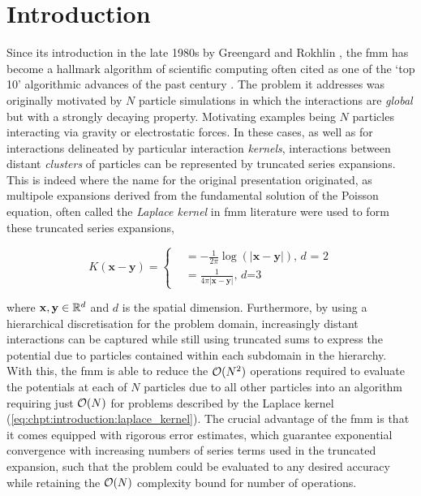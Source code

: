 
\chapter{Introduction}\label{chpt:introduction}
\thispagestyle{chaptertitle} %
Since its introduction in the late 1980s by Greengard and Rokhlin \cite{greengard1987fast}, the \acrfull{fmm} has become a hallmark algorithm of scientific computing often cited as one of the `top 10' algorithmic advances of the past century \cite{cipra2000best}. The problem it addresses was originally motivated by $N$ particle simulations in which the interactions are \textit{global} but with a strongly decaying property. Motivating examples being $N$ particles interacting via gravity or electrostatic forces. In these cases, as well as for interactions delineated by particular interaction \textit{kernels}, interactions between distant \textit{clusters} of particles can be represented by truncated series expansions. This is indeed where the name for the original presentation originated, as multipole expansions derived from the fundamental solution of the Poisson equation, often called the \textit{Laplace kernel} in \acrshort{fmm} literature were used to form these truncated series expansions,


\begin{equation}
    K(\mathbf{x-y}) =  \begin{cases}
        &= -\frac{1}{2\pi} \log(|\mathbf{x-y}|) \text{, $d$ = 2} \\
        &= \frac{1}{4\pi | \mathbf{x-y}|} \text{, $d$=3 }
    \end{cases}
    \label{eq:chpt:introduction:laplace_kernel}
\end{equation}

where $\mathbf{x}, \mathbf{y} \in \mathbb{R}^d$ and $d$ is the spatial dimension. Furthermore, by using a hierarchical discretisation for the problem domain, increasingly distant interactions can be captured while still using truncated sums to express the potential due to particles contained within each subdomain in the hierarchy. With this, the \acrshort{fmm} is able to reduce the $\mathcal{O}(N^2)$ operations required to evaluate the potentials at each of $N$ particles due to all other particles into an algorithm requiring just $\mathcal{O}(N)$ for problems described by the Laplace kernel (\ref{eq:chpt:introduction:laplace_kernel}). The crucial advantage of the \acrshort{fmm} is that it comes equipped with rigorous error estimates, which guarantee exponential convergence with increasing numbers of series terms used in the truncated expansion, such that the problem could be evaluated to any desired accuracy while retaining the $\mathcal{O}(N)$ complexity bound for number of operations.

